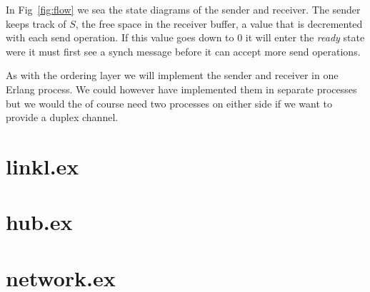 \documentclass[a4paper,11pt]{article}
\begin{document}
In Fig~\ref{fig:flow} we sea the state diagrams of the sender and
receiver. The sender keeps track of $S$,
the free space in the receiver buffer, a value that is decremented
with each send operation. If this value goes down to $0$
it will enter the {\em ready} state were it must first see a synch
message before it can accept more send operations. 

As with the ordering layer we will implement the sender and receiver
in one Erlang process. We could however have implemented them in
separate processes but we would the of course need two processes on
either side if we want to provide a duplex channel. 



\newpage
\appendix
\section{linkl.ex} \label{app:link}

\pagebreak
\section{hub.ex} \label{app:hub}

\pagebreak
\section{network.ex} \label{app:net}

\end{document}
